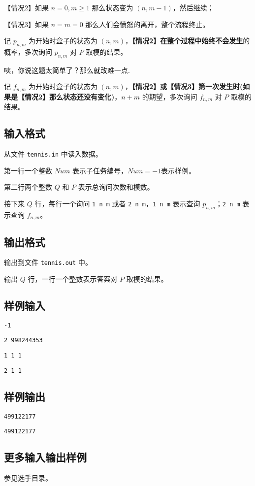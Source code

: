 \documentclass[UTF8]{article}
\begin{document}
【情况2】如果 $n=0,m \geq 1$ 那么状态变为 $(n,m-1)$，然后继续；

【情况3】如果 $n=m=0$ 那么人们会愤怒的离开，整个流程终止。

记 $p_{n,m}$ 为开始时盒子的状态为 $(n,m)$，\textbf{【情况2】在整个过程中始终不会发生}的概率，多次询问 $p_{n,m}$ 对 $P$ 取模的结果。

咦，你说这题太简单了？那么就改难一点.

记 $f_{n,m}$ 为开始时盒子的状态为 $(n,m)$，\textbf{【情况2】或【情况3】第一次发生时(如果是【情况2】那么状态还没有变化)}，$n+m$ 的期望，多次询问 $f_{n,m}$ 对 $P$ 取模的结果。

\subsection{输入格式}

从文件 \texttt{tennis.in} 中读入数据。

第一行一个整数 $Num$ 表示子任务编号，$Num=-1$表示样例。

第二行两个整数 $Q$ 和 $P$ 表示总询问次数和模数。

接下来 $Q$ 行，每行一个询问 \texttt{1 n m} 或者 \texttt{2 n m}，\texttt{1 n m} 表示查询 $p_{n,m}$；\texttt{2 n m} 表示查询 $f_{n,m}$。

\subsection{输出格式}

输出到文件 \texttt{tennis.out} 中。

输出 $Q$ 行，一行一个整数表示答案对 $P$ 取模的结果。

\subsection{样例输入}

\texttt{-1}

\texttt{2 998244353}

\texttt{1 1 1}

\texttt{2 1 1}

\subsection{样例输出}

\texttt{499122177}

\texttt{499122177}

\subsection{更多输入输出样例}
	参见选手目录。
\end{document}
